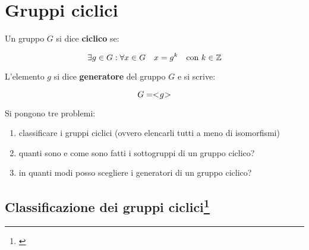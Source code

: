 \chapter{Gruppi ciclici}


Un gruppo $G$ si dice \textbf{ciclico} se:

\begin{equation}
	\exists g \in G : \forall x \in G \quad x=g^k \quad \text{con } k \in \mathbb{Z}
\end{equation}

L'elemento $g$ si dice \textbf{generatore} del gruppo $G$ e si scrive:

\begin{equation}
	G = < \negmedspace g \negmedspace >
\end{equation}

Si pongono tre problemi:

\begin{enumerate}
	\item classificare i gruppi ciclici (ovvero elencarli tutti a meno di isomorfismi)
	\item quanti sono e come sono fatti i sottogruppi di un gruppo ciclico?
	\item in quanti modi posso scegliere i generatori di un gruppo ciclico?
\end{enumerate}

\section[Classificazione dei gruppi ciclici]{Classificazione dei gruppi ciclici\footnote{\cite[29 settembre 2020]{lucchini}}}

